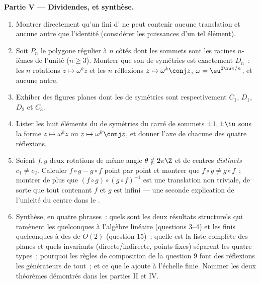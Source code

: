 \begin{problem}
\medskip
\noindent\textbf{Partie V --- Dividendes, et synthèse.}
\begin{enumerate}[resume]
  \item Montrer directement qu'un  fini d' ne peut
        contenir aucune translation et aucune 
        autre que l'identité (considérer les puissances d'un tel
        élément).
  \item Soit $P_n$ le polygone régulier à $n$ côtés dont les
        sommets sont les racines $n$-ièmes de l'unité ($n \geq
        3$). Montrer que son  de symétries est exactement
        $D_n$~: les $n$ rotations $z \mapsto \omega^k z$ et les
        $n$ réflexions $z \mapsto \omega^k \conj z$, $\omega =
        \eu^{2\iu\pi/n}$, et aucune autre.
  \item Exhiber des figures planes dont les  de symétries
        sont respectivement $C_1$, $D_1$, $D_2$ et $C_3$.
  \item Lister les huit éléments du  de symétries du carré
        de sommets $\pm1, \pm\iu$ sous la forme $z \mapsto
        \omega^k z$ ou $z \mapsto \omega^k\conj z$, et donner
        l'axe de chacune des quatre réflexions.
  \item Soient $f, g$ deux rotations de même angle $\theta
        \notin 2\pi\Z$ et de centres \emph{distincts} $c_1 \neq
        c_2$. Calculer $f\circ g - g\circ f$ point par point et
        montrer que $f\circ g \neq g\circ f$~; montrer de plus que
        $(f \circ g)\circ(g\circ f)^{-1}$ est une translation non
        triviale, de sorte que tout  contenant $f$ et $g$
        est infini --- une seconde explication de l'unicité du
        centre dans le .
  \item Synthèse, en quatre phrases~: quels sont les deux
        résultats structurels qui ramènent les 
        quelconques à l'algèbre linéaire (questions 3--4) et les
         finis quelconques à des  de $O(2)$
        (question 15)~; quelle est la liste complète des
         planes et quels invariants
        (directe/indirecte, points fixes) séparent les quatre
        types~; pourquoi les règles de composition de la question
        9 font des réflexions les générateurs de tout~; et ce que
        le  ajoute à l'échelle finie.
        Nommer les deux théorèmes démontrés dans les parties II et
        IV.
\end{enumerate}
\end{problem}
